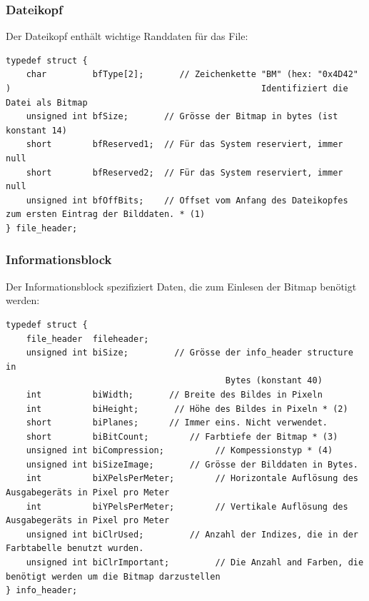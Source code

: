 \documentclass[11pt]{scrartcl}
\begin{document}
\newpage
\subsubsection{Dateikopf}


Der Dateikopf enthält wichtige Randdaten für das File:



\lstset{language=C, basicstyle=\small,  numbers=left, numberstyle=\tiny}
\begin{lstlisting}[caption={Struct: file\_header},frame=single, captionpos=b, label=code-comm-task, xleftmargin=.03\textwidth]
typedef struct {
	char         bfType[2]; 	  // Zeichenkette "BM" (hex: "0x4D42" )											     	Identifiziert die Datei als Bitmap     
	unsigned int bfSize;       // Grösse der Bitmap in bytes (ist konstant 14)	     
	short        bfReserved1;  // Für das System reserviert, immer null   
	short        bfReserved2;  // Für das System reserviert, immer null  
	unsigned int bfOffBits;    // Offset vom Anfang des Dateikopfes zum ersten Eintrag der Bilddaten. * (1)   
} file_header;
\end{lstlisting}

\subsubsection{Informationsblock}

Der Informationsblock spezifiziert Daten, die zum Einlesen der Bitmap benötigt werden:
\lstset{language=C, basicstyle=\small,  numbers=left, numberstyle=\tiny}
\begin{lstlisting}[caption={Struct: info\_header},frame=single, captionpos=b, label=code-comm-task, xleftmargin=.03\textwidth]
typedef struct {
	file_header  fileheader;
	unsigned int biSize;  		 // Grösse der info_header structure in
  										   Bytes (konstant 40)
	int          biWidth;  		// Breite des Bildes in Pixeln
	int          biHeight;		 // Höhe des Bildes in Pixeln * (2)
	short        biPlanes; 		// Immer eins. Nicht verwendet. 
	short        biBitCount;  		// Farbtiefe der Bitmap * (3)
	unsigned int biCompression; 		 // Kompessionstyp * (4)
	unsigned int biSizeImage;  		// Grösse der Bilddaten in Bytes.
	int          biXPelsPerMeter;		 // Horizontale Auflösung des Ausgabegeräts in Pixel pro Meter
	int          biYPelsPerMeter; 		 // Vertikale Auflösung des 																Ausgabegeräts in Pixel pro Meter
	unsigned int biClrUsed;  		// Anzahl der Indizes, die in der Farbtabelle benutzt wurden. 
	unsigned int biClrImportant;		 // Die Anzahl and Farben, die															 benötigt werden um die Bitmap darzustellen
} info_header;
\end{lstlisting}
\end{document}
